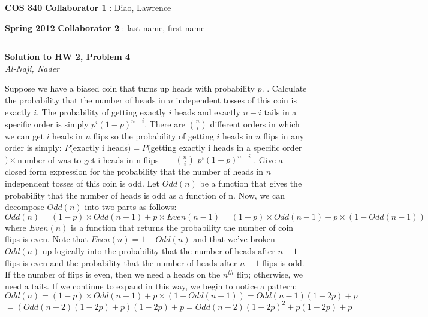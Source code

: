 \documentclass[12pt]{article}
\newcommand{\myheader}[4]
{\vspace*{-0.5in}
\noindent
{#1} \hfill {#3}

\noindent
{#2} \hfill {#4}

\noindent
\rule[8pt]{\textwidth}{1pt}

\vspace{1ex} 
}  %
\newcommand{\myalgsheader}[0]
{\myheader
{ {\bf{COS 340}} }
{ {\bf{Spring 2012}} }
{ {\bf{Collaborator 1}} : Diao, Lawrence }
{ {\bf{Collaborator 2}} : last name, first name}
}
\newcommand{\myhwtitle}[3]
{\begin{center}
{\large {\bf Solution to HW {#1}, Problem {#2}}}\\
\medskip 
{\it {#3}} %
\end{center}}
\begin{document}
\pagebreak
\myalgsheader
\pagestyle{plain}
\myhwtitle{2}{4}{Al-Naji, Nader}
\bigskip
Suppose we have a biased coin that turns up heads with probability $p$.
\newline
{}. Calculate the probability that the number of heads in $n$ independent tosses of this coin is exactly $i$.
\newline
\newline
The probability of getting exactly $i$ heads and exactly $n-i$ tails in a specific order is simply
$p^i (1-p)^{n-i}$. There are $n \choose i$ different orders in which we can get $i$ heads 
in $n$ flips so the probability of getting $i$ heads in $n$ flips in any order is simply:
\newline
\newline
$P($exactly i heads$) = P($getting exactly i heads in a specific order$) \times $number of was to get i heads in n flips
$= $ $n \choose i$ $p^i  (1-p)^{n-i}$
\newline
{}. Give a closed form expression for the probability that the number of heads in $n$ independent tosses of
this coin is odd.
\newline
\newline
Let $Odd(n)$ be a function that gives the probability that the number of heads is odd as a function of n.
Now, we can decompose $Odd(n)$ into two parts as follows:
\newline
\newline
$Odd(n) = (1-p) \times Odd(n-1) + p \times Even(n-1) = (1-p) \times Odd(n-1) + p \times (1 - Odd(n-1))$
\newline
\newline
where $Even(n)$ is a function that returns the probability the number of coin flips is even. Note that
$Even(n) = 1 - Odd(n)$ and that we've broken $Odd(n)$ up logically into the probability that the number
of heads after $n-1$ flips is even and the probability that the number of heads after $n-1$ flips is odd. If
the number of flips is even, then we need a heads on the $n^{th}$ flip; otherwise, we need a tails. If we
continue to expand in this way, we begin to notice a pattern:
\newline
\newline
$Odd(n) = (1-p) \times Odd(n-1) + p \times (1 - Odd(n-1)) = Odd(n-1)(1-2p)+p$
\newline
\newline
$= (Odd(n-2)(1-2p) + p)(1-2p) + p = Odd(n-2)(1-2p)^2 + p(1-2p) + p$
\end{document}
